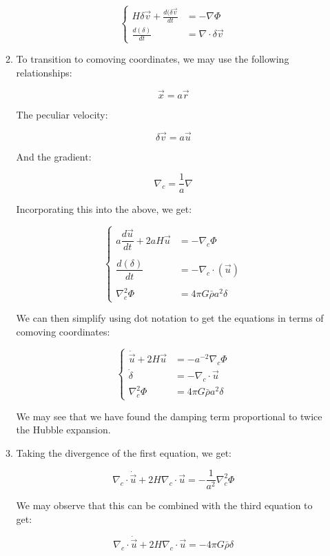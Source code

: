 \begin{enumerate}
\begin{enumerate}
          $$\boxed{\left\{\begin{array}{ll} H\delta\vec{v}+\frac{d(\delta\vec{v}}{dt}&= -\nabla \Phi\\\frac{d(\delta)}{dt}&=\nabla\cdot\delta\vec{v}\end{array}}$$

      \item To transition to comoving coordinates, we may use the following relationships:

        $$\vec{x}=a\vec{r}$$

        The peculiar velocity:

        $$\delta\vec{v}=a\vec{u}$$

        And the gradient:

        $$\nabla_c=\frac{1}{a}\nabla$$

        Incorporating this into the above, we get:

        $$\left\{\begin{array}{ll} a\dfrac{d\vec{u}}{dt}+2aH\vec{u}&=-\nabla_c\Phi\\\\ \dfrac{d(\delta)}{dt} &= -\nabla_c\cdot(\vec{u})\\\\ \nabla^2_c\Phi&=4\pi G\bar{\rho}a^2\delta \end{array}$$

        We can then simplify using dot notation to get the equations in terms of comoving coordinates:

        $$\boxed{\left\{\begin{array}{ll} \dot{\vec{u}}+2H\vec{u}&=-a^{-2}\nabla_c\Phi\\ \dot{\delta} &= -\nabla_c\cdot\vec{u}\\ \nabla^2_c\Phi&=4\pi G\bar{\rho}a^2\delta \end{array}}$$

        We may see that we have found the damping term proportional to twice the Hubble expansion.

        \item Taking the divergence of the first equation, we get:

          $$\nabla_c\cdot\dot{\vec{u}}+2H\nabla_c\cdot\vec{u}=-\frac{1}{a^2}\nabla_c^2\Phi$$

          We may observe that this can be combined with the third equation to get:

          $$\nabla_c\cdot\dot{\vec{u}}+2H\nabla_c\cdot\vec{u}=-4\pi G\bar{\rho}\delta$$


\end{enumerate}
\end{enumerate}
